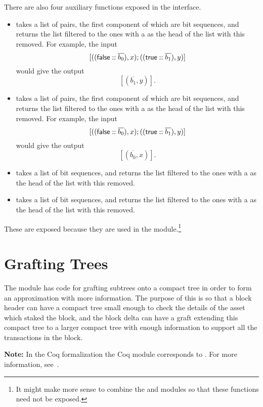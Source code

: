 There are also four auxiliary functions exposed in the interface.
\begin{itemize}
\item {} takes a list of pairs, the first component of which are bit sequences, and returns the list
filtered to the ones with a {} as the head of the list with this {} removed.
For example, the input
$$[((\val{false}::\overline{b_0}),x);((\val{true}::\overline{b_1}),y)]$$
would give the output
$$[(\overline{b_1},y)].$$
\item {} takes a list of pairs, the first component of which are bit sequences, and returns the list
filtered to the ones with a {} as the head of the list with this {} removed.
For example, the input
$$[((\val{false}::\overline{b_0}),x);((\val{true}::\overline{b_1}),y)]$$
would give the output
$$[(\overline{b_0},x)].$$
\item {} takes a list of bit sequences, and returns the list
filtered to the ones with a {} as the head of the list with this {} removed.
\item {} takes a list of bit sequences, and returns the list
filtered to the ones with a {} as the head of the list with this {} removed.
\end{itemize}
These are exposed because they are used in the {} module.\footnote{It might make more sense to combine the {} and {} modules so that these functions need not be exposed.}

\section{Grafting Trees}

The module {}
has code for grafting subtrees onto a compact tree in order
to form an approximation with more information.
The purpose of this is so that a block header can
have a compact tree small enough to check the details of the asset which
staked the block,
and the block delta can have a graft extending this compact tree
to a larger compact tree with enough information to support
all the transactions in the block.

{\bf{Note:}} 
In the Coq formalization the Coq module {}
corresponds to {}.
For more information, see~\cite{White2015b}.

